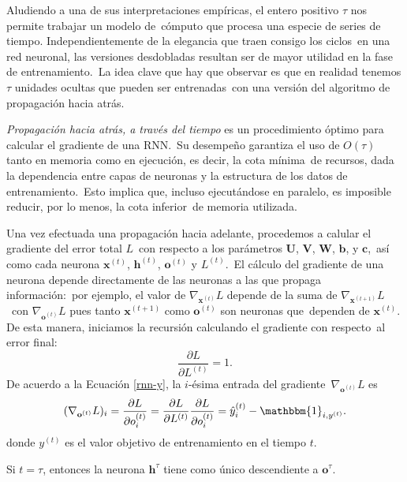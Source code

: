 \noindent
Aludiendo a una de sus interpretaciones empíricas, el entero positivo $\tau$ nos permite trabajar un modelo de\
cómputo que procesa una especie de series de tiempo. Independientemente de la elegancia que traen consigo los ciclos\
en una red neuronal, las versiones desdobladas resultan ser de mayor utilidad en la fase de entrenamiento.\
La idea clave que hay que observar es que en realidad tenemos $\tau$ unidades ocultas que pueden ser entrenadas\
con una versión del algoritmo de propagación hacia atrás.\par
\emph{Propagación hacia atrás, a través del tiempo} es un procedimiento óptimo para calcular el gradiente de una RNN.\
Su desempeño garantiza el uso de $O(\tau)$ tanto en memoria como en ejecución, es decir, la cota mínima\
de recursos, dada la dependencia entre capas de neuronas y la estructura de los datos de entrenamiento.\
Esto implica que, incluso ejecutándose en paralelo, es imposible reducir, por lo menos, la cota inferior\
de memoria utilizada.\par
Una vez efectuada una propagación hacia adelante, procedemos a calular el gradiente del error total $L$\
con respecto a los parámetros $\mathbf{U}$, $\mathbf{V}$, $\mathbf{W}$, $\mathbf{b}$, y $\mathbf{c}$,\
así como cada neurona $\mathbf{x}^{(t)}$, $\mathbf{h}^{(t)}$, $\mathbf{o}^{(t)}$ y $L^{(t)}$.\
El cálculo del gradiente de una neurona depende directamente de las neuronas a las que propaga información:\
por ejemplo, el valor de $\nabla_{\mathbf{x}^{(t)}}L$ depende de la suma de $\nabla_{\mathbf{x}^{(t+1)}}L$\
con $\nabla_{\mathbf{o}^{(t)}}L$ pues tanto $\mathbf{x}^{(t+1)}$ como $\mathbf{o}^{(t)}$ son neuronas que\
dependen de $\mathbf{x}^{(t)}$. De esta manera, iniciamos la recursión calculando el gradiente con respecto\
al error final:
\begin{equation}
  \frac{\partial L}{\partial L^{(t)}} = 1.
\end{equation}
\newpage
De acuerdo a la Ecuación \ref{rnn-y}, la $i$-ésima entrada del gradiente\
$\nabla_{\mathbf{o}^{(t)}}L$ es
\begin{equation}
  (\nabla_{\mathbf{o}^{(t)}}L)_i = \frac{\partial L}{\partial o_i^{(t)}} =
  \frac{\partial L}{\partial L^{(t)}} \frac{\partial L}{\partial o_i^{(t)}} =
  \hat{y}_i^{(t)} - \mathbbm{1}_{i, y^{(t)}}.
\end{equation}
donde $y^{(t)}$ es el valor objetivo de entrenamiento en el tiempo $t$.\par
Si $t = \tau$, entonces la neurona $\mathbf{h}^{\tau}$ tiene como único descendiente a $\mathbf{o}^{\tau}$.\
